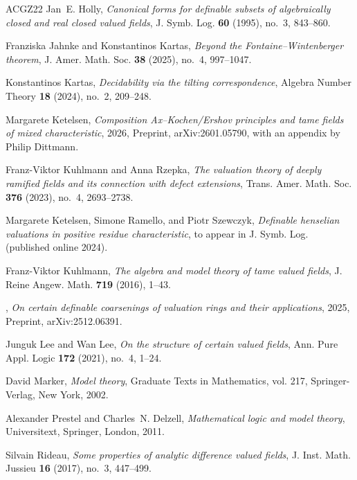 \documentclass[a4paper]{amsart}
\theoremstyle{mystyle2}
\theoremstyle{mystyle}
\numberwithin{equation}{section}
\begin{document}
\begin{thebibliography}{ACGZ22}
		Jan~E. Holly, \emph{Canonical forms for definable subsets of algebraically
			closed and real closed valued fields}, J. Symb. Log. \textbf{60} (1995),
		no.~3, 843--860.
		
		Franziska Jahnke and Konstantinos Kartas, \emph{Beyond the
			{F}ontaine--{W}intenberger theorem}, J. Amer. Math. Soc. \textbf{38} (2025),
		no.~4, 997--1047.
		
		Konstantinos Kartas, \emph{Decidability via the tilting correspondence},
		Algebra Number Theory \textbf{18} (2024), no.~2, 209--248.
		
		Margarete Ketelsen, \emph{Composition {A}x--{K}ochen/{E}rshov principles and
			tame fields of mixed characteristic}, 2026, Preprint, arXiv:2601.05790, with
		an appendix by Philip Dittmann.
		
		Franz-Viktor Kuhlmann and Anna Rzepka, \emph{The valuation theory of deeply
			ramified fields and its connection with defect extensions}, Trans. Amer.
		Math. Soc. \textbf{376} (2023), no.~4, 2693--2738.
		
		Margarete Ketelsen, Simone Ramello, and Piotr Szewczyk, \emph{Definable
			henselian valuations in positive residue characteristic}, to appear in J.
		Symb. Log. (published online 2024).
		
		Franz-Viktor Kuhlmann, \emph{The algebra and model theory of tame valued
			fields}, J. Reine Angew. Math. \textbf{719} (2016), 1--43.
		
		\bysame, \emph{On certain definable coarsenings of valuation rings and their
			applications}, 2025, Preprint, arXiv:2512.06391.
		
		Junguk Lee and Wan Lee, \emph{On the structure of certain valued fields}, Ann.
		Pure Appl. Logic \textbf{172} (2021), no.~4, 1--24.
		
		David Marker, \emph{Model theory}, Graduate Texts in Mathematics, vol. 217,
		Springer-Verlag, New York, 2002.
		
		Alexander Prestel and Charles~N. Delzell, \emph{Mathematical logic and model
			theory}, Universitext, Springer, London, 2011.
		
		Silvain Rideau, \emph{Some properties of analytic difference valued fields}, J.
		Inst. Math. Jussieu \textbf{16} (2017), no.~3, 447--499.
		

\end{thebibliography}
\end{document}
